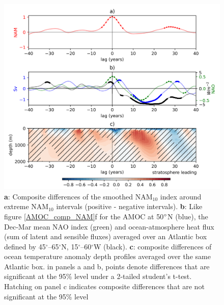 \begin{figure}[h!]
\begin{center}
\noindent\includegraphics[width = 0.7\linewidth]{Figures/Figures-surface/Ocean_T_AMOC_NAO_responses_FINAL.png} 
\caption[Composite differences of NAO, heat flux and ocean temperature around extreme NAM$_{10}$ intervals.]{\textbf{a}: Composite differences of the smoothed NAM$_{10}$ index around extreme NAM$_{10}$ intervals (positive - negative intervals).
\textbf{b}: Like figure \ref{AMOC_comp_NAM}f for the AMOC at 50$\degree$N (blue), the Dec-Mar mean NAO index (green) and ocean-atmosphere heat flux (sum of latent and sensible fluxes) averaged over an Atlantic box defined by 45$^{\circ}$–65$^{\circ}$N, 15$^{\circ}$–60$^{\circ}$W (black). \textbf{c}: composite differences of ocean temperature anomaly depth profiles averaged over the same Atlantic box. in panels a and b, points denote differences that are significant at the 95\% level under a 2-tailed student's t-test. Hatching on panel c indicates composite differences that are not significant at the 95\% level}
\label{NAO_AMOC_T_response}
\end{center}
\end{figure}


